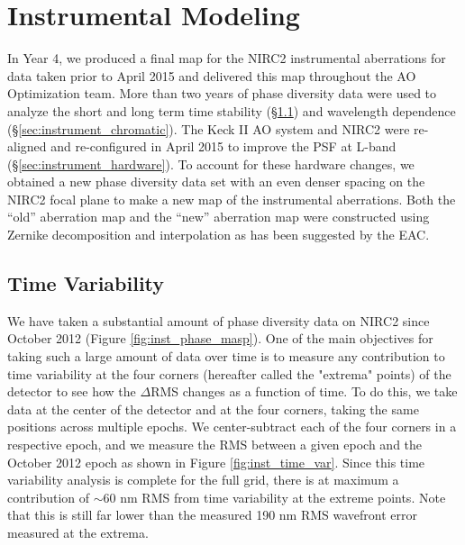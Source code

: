 \section{Instrumental Modeling}
\label{sec:instrument}

In Year 4, we produced a final map for the NIRC2 instrumental
aberrations for data taken prior to April 2015 and delivered this map
throughout the AO Optimization team. More than two years of
phase diversity data were used to analyze the short and long term time
stability (\S\ref{sec:instrument_time}) and wavelength dependence 
(\S\ref{sec:instrument_chromatic}). 
The Keck \textrm{II} AO system and NIRC2 were re-aligned and
re-configured in April 2015 to improve the PSF at L-band
(\S\ref{sec:instrument_hardware}). To account for these hardware changes, we 
obtained a new phase diversity data set with an even denser spacing on
the NIRC2 focal plane to make a new map of the instrumental
aberrations.
Both the ``old'' aberration map and the ``new'' aberration map were
constructed using Zernike decomposition and interpolation as has been
suggested by the EAC.

\subsection{Time Variability}
\label{sec:instrument_time}
We have taken a substantial amount of phase diversity data on NIRC2
since October 2012 (Figure \ref{fig:inst_phase_masp}). One of the main objectives
for taking such a large amount of data over time is to measure any
contribution to time variability at the four corners (hereafter called
the "extrema" points) of the detector to see how the $\Delta$RMS
changes as a function of time. To do this, we take data at the center
of the detector and at the four corners, taking the same positions
across multiple epochs. We center-subtract each of the four corners in
a respective epoch, and we measure the RMS between a given epoch and
the October 2012 epoch as shown in Figure \ref{fig:inst_time_var}. 
Since this time variability analysis is complete for the full grid,
there is at maximum a contribution of $\sim$60 nm RMS from time
variability at the extreme points. Note that this is still far lower
than the measured 190 nm RMS wavefront error measured at the extrema.


    
    
    
    
    
  
  
  
  